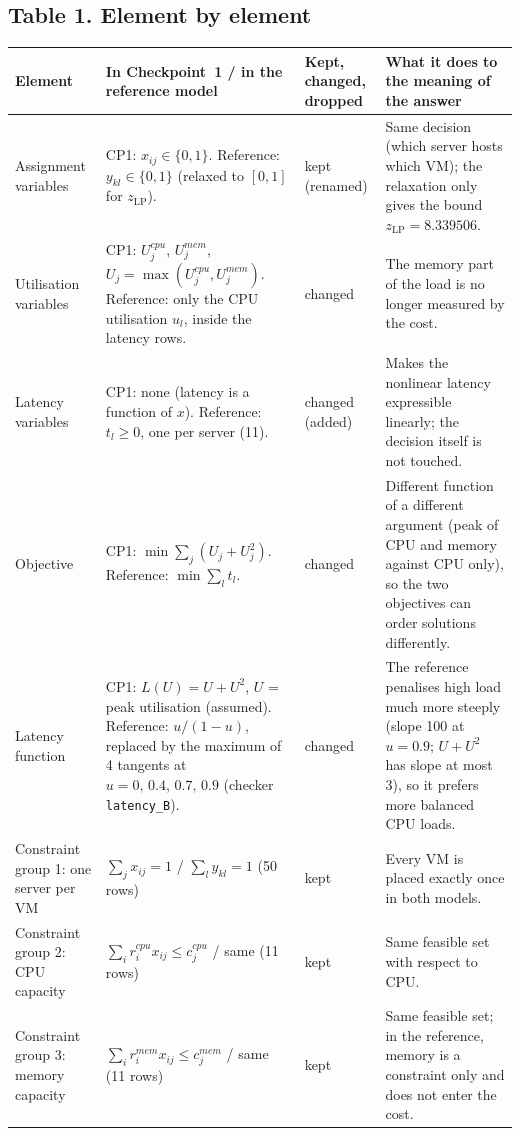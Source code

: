 \documentclass[11pt,a4paper]{article}
\newcommand{\zLP}{z_{\mathrm{LP}}}
\begin{document}
\subsection*{Table 1. Element by element}
{\footnotesize\setlength{\tabcolsep}{4pt}\renewcommand{\arraystretch}{0.95}
\begin{xltabular}{\textwidth}{@{}>{\raggedright\arraybackslash}p{2.6cm}>{\raggedright\arraybackslash}X>{\raggedright\arraybackslash}p{1.5cm}>{\raggedright\arraybackslash}X@{}}
\toprule
Element & In Checkpoint~1 / in the reference model & Kept, changed, dropped & What it does to the meaning of the answer\\
\midrule
\endhead
Assignment variables & CP1: $x_{ij}\in\{0,1\}$. Reference: $y_{kl}\in\{0,1\}$ (relaxed to $[0,1]$ for $\zLP$). & kept (renamed) & Same decision (which server hosts which VM); the relaxation only gives the bound $\zLP=8.339506$.\\
Utilisation variables & CP1: $U^{cpu}_j$, $U^{mem}_j$, $U_j=\max(U^{cpu}_j,U^{mem}_j)$. Reference: only the CPU utilisation $u_l$, inside the latency rows. & changed & The memory part of the load is no longer measured by the cost.\\
Latency variables & CP1: none (latency is a function of $x$). Reference: $t_l\ge 0$, one per server (11). & changed (added) & Makes the nonlinear latency expressible linearly; the decision itself is not touched.\\
Objective & CP1: $\min\sum_j (U_j+U_j^2)$. Reference: $\min\sum_l t_l$. & changed & Different function of a different argument (peak of CPU and memory against CPU only), so the two objectives can order solutions differently.\\
Latency function & CP1: $L(U)=U+U^2$, $U$ = peak utilisation (assumed). Reference: $u/(1-u)$, replaced by the maximum of 4 tangents at $u=0,\,0.4,\,0.7,\,0.9$ (checker \texttt{latency\_B}). & changed & The reference penalises high load much more steeply (slope 100 at $u=0.9$; $U+U^2$ has slope at most 3), so it prefers more balanced CPU loads.\\
Constraint group 1: one server per VM & $\sum_j x_{ij}=1$ / $\sum_l y_{kl}=1$ (50 rows) & kept & Every VM is placed exactly once in both models.\\
Constraint group 2: CPU capacity & $\sum_i r^{cpu}_i x_{ij}\le c^{cpu}_j$ / same (11 rows) & kept & Same feasible set with respect to CPU.\\
Constraint group 3: memory capacity & $\sum_i r^{mem}_i x_{ij}\le c^{mem}_j$ / same (11 rows) & kept & Same feasible set; in the reference, memory is a constraint only and does not enter the cost.\\

\end{xltabular}}
\end{document}
